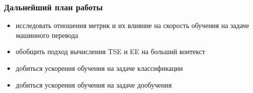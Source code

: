 \documentclass{beamer}
\begin{document}
\begin{frame}
	\frametitle{Дальнейший план работы}
	\begin{itemize}
		\item исследовать отношения метрик и их влияние на скорость обучения на задаче машинного перевода
		\item обобщить подход вычисления TSE и EE на больший контекст
		\item добиться ускорения обучения на задаче классификации
		\item добиться ускорения обучения на задаче дообучения
	\end{itemize}
\end{frame}
\end{document}

